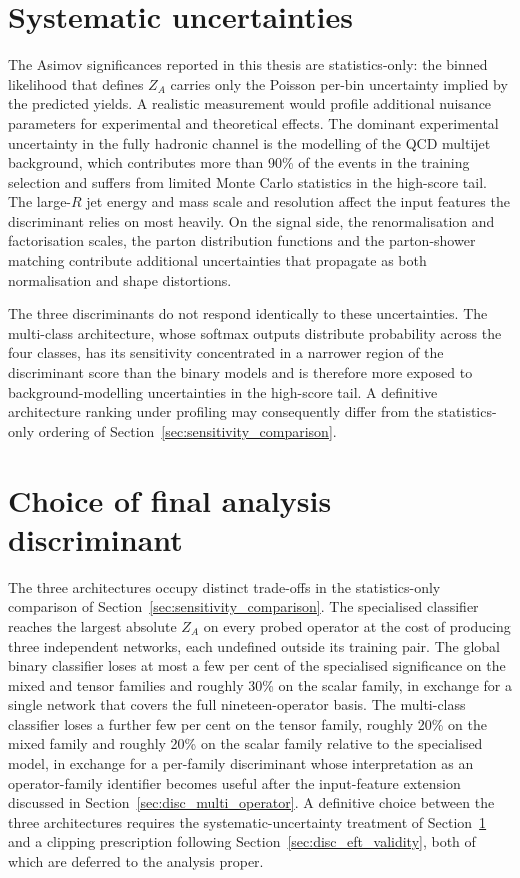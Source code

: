 \section{Systematic uncertainties}
\label{sec:disc_systematics}

The Asimov significances reported in this thesis are statistics-only: the binned likelihood that defines $Z_A$ carries only the Poisson per-bin uncertainty implied by the predicted yields. A realistic measurement would profile additional nuisance parameters for experimental and theoretical effects. The dominant experimental uncertainty in the fully hadronic channel is the modelling of the QCD multijet background, which contributes more than 90\% of the events in the training selection and suffers from limited Monte Carlo statistics in the high-score tail. The large-$R$ jet energy and mass scale and resolution affect the input features the discriminant relies on most heavily. On the signal side, the renormalisation and factorisation scales, the parton distribution functions and the parton-shower matching contribute additional uncertainties that propagate as both normalisation and shape distortions.

The three discriminants do not respond identically to these uncertainties. The multi-class architecture, whose softmax outputs distribute probability across the four classes, has its sensitivity concentrated in a narrower region of the discriminant score than the binary models and is therefore more exposed to background-modelling uncertainties in the high-score tail. A definitive architecture ranking under profiling may consequently differ from the statistics-only ordering of Section~\ref{sec:sensitivity_comparison}.

\section{Choice of final analysis discriminant}
\label{sec:disc_discriminant}

The three architectures occupy distinct trade-offs in the statistics-only comparison of Section~\ref{sec:sensitivity_comparison}. The specialised classifier reaches the largest absolute $Z_A$ on every probed operator at the cost of producing three independent networks, each undefined outside its training pair. The global binary classifier loses at most a few per cent of the specialised significance on the mixed and tensor families and roughly 30\% on the scalar family, in exchange for a single network that covers the full nineteen-operator basis. The multi-class classifier loses a further few per cent on the tensor family, roughly 20\% on the mixed family and roughly 20\% on the scalar family relative to the specialised model, in exchange for a per-family discriminant whose interpretation as an operator-family identifier becomes useful after the input-feature extension discussed in Section~\ref{sec:disc_multi_operator}. A definitive choice between the three architectures requires the systematic-uncertainty treatment of Section~\ref{sec:disc_systematics} and a clipping prescription following Section~\ref{sec:disc_eft_validity}, both of which are deferred to the analysis proper.
